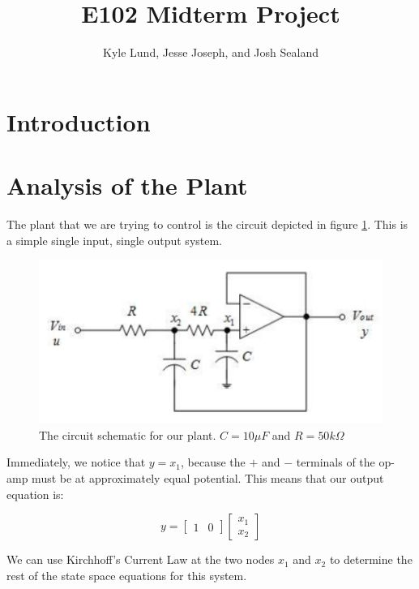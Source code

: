 \documentclass[11pt]{article}
\title{\vspace{100pt} E102 Midterm Project \vspace{20pt}}
\author{Kyle Lund, Jesse Joseph, and Josh Sealand}
\begin{document}
\maketitle
\pagebreak

\section*{Introduction}


\section*{Analysis of the Plant}
The plant that we are trying to control is the circuit depicted in figure \ref{fig:circuit}.
This is a simple single input, single output system.

\begin{figure}[h]
\centering
\includegraphics[width=0.6\linewidth]{circuit}
\caption{The circuit schematic for our plant. $C = 10\mu F$ and $R=50k\Omega$}
\label{fig:circuit}
\end{figure}

Immediately, we notice that $y=x_1$, because the $+$ and $-$ terminals of the op-amp must be at approximately equal potential.
This means that our output equation is:

\begin{equation}
y = \begin{bmatrix}
1 & 0
\end{bmatrix}
\begin{bmatrix}
x_1 \\ x_2
\end{bmatrix}
\end{equation}

We can use Kirchhoff's Current Law at the two nodes $x_1$ and $x_2$ to determine the rest of the state space equations for this system.
\end{document}
